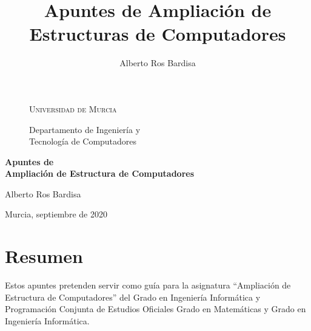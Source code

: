 \documentclass[12pt,onecolumn]{memoir}
\begin{document}

\sloppy
{}

\title{Apuntes de Ampliación de Estructuras de Computadores}

\author{Alberto Ros Bardisa}

\thispagestyle{empty}

\begin{center}

\begin{figure}
\centering

  \Large


  \textsc{Universidad de Murcia}

  \large

  Departamento de Ingeniería y \\
  Tecnología de Computadores

  \vspace{3cm}

\end{figure}

\huge

\textbf{Apuntes de\\ Ampliación de Estructura de Computadores}

\vspace{7cm}

\normalsize

Alberto Ros Bardisa

\vspace{0.5cm}

Murcia, septiembre de 2020

\end{center}

\cleardoublepage 

\chapter*{Resumen}

Estos apuntes pretenden servir como guía para la asignatura
``Ampliación de Estructura de Computadores'' del Grado en Ingeniería 
Informática y Programación Conjunta de Estudios Oficiales Grado
en Matemáticas y Grado en Ingeniería Informática.
\end{document}
